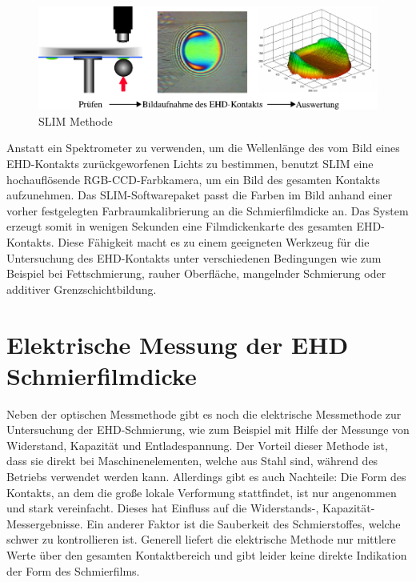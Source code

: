 \begin{figure}[htb]
    \centering
    \includegraphics[]{./images/slim_methode.pdf}
    \caption{SLIM Methode \cite{ehl_broshure}}
    \label{fig:ehd_slim_methode}
\end{figure}

Anstatt ein Spektrometer zu verwenden, um die Wellenlänge des vom Bild eines EHD-Kontakts zurückgeworfenen Lichts zu bestimmen, benutzt SLIM eine hochauflösende RGB-CCD-Farbkamera, um ein Bild des gesamten Kontakts aufzunehmen.
Das SLIM-Softwarepaket passt die Farben im Bild anhand einer vorher festgelegten Farbraumkalibrierung an die Schmierfilmdicke an.
Das System erzeugt somit in wenigen Sekunden eine Filmdickenkarte des gesamten EHD-Kontakts.
Diese Fähigkeit macht es zu einem geeigneten Werkzeug für die Untersuchung des EHD-Kontakts unter verschiedenen Bedingungen wie zum Beispiel bei Fettschmierung, rauher Oberfläche, mangelnder Schmierung oder additiver Grenzschichtbildung.

\section{Elektrische Messung der EHD Schmierfilmdicke}
\label{sec:elektrische_messung_der_ehd_schmierfilmdicke}

Neben der optischen Messmethode gibt es noch die elektrische Messmethode zur Untersuchung der EHD-Schmierung, wie zum Beispiel mit Hilfe der Messunge von Widerstand, Kapazität und Entladespannung.
Der Vorteil dieser Methode ist, dass sie direkt bei Maschinenelementen, welche aus Stahl sind, während des Betriebs verwendet werden kann.
Allerdings gibt es auch Nachteile:
Die Form des Kontakts, an dem die große lokale Verformung stattfindet, ist nur angenommen und stark vereinfacht.
Dieses hat Einfluss auf die Widerstands-, Kapazität-Messergebnisse.
Ein anderer Faktor ist die Sauberkeit des Schmierstoffes, welche schwer zu kontrollieren ist.
Generell liefert die elektrische Methode nur mittlere Werte über den gesamten Kontaktbereich und gibt leider keine direkte Indikation der Form des Schmierfilms.

